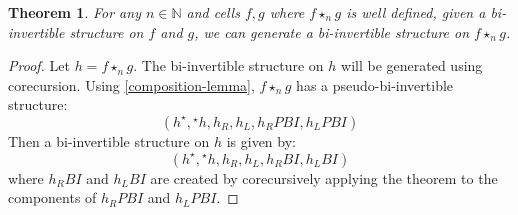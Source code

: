 \documentclass{article}
\newtheorem{theorem}{Theorem}
\theoremstyle{definition}
\theoremstyle{remark}
\newcommand{\linv}[1]{{}^\star\!#1}
\newcommand{\rinv}[1]{#1^\star}
\newcommand{\comp}{\star}
\begin{document}
\begin{theorem}\label{bi-inv-composition}
  For any \(n \in \mathbb{N}\) and cells \(f,g\) where \(f \comp_n g\) is well defined, given a bi-invertible structure on \(f\) and \(g\), we can generate a bi-invertible structure on \(f \comp_n g\).
\end{theorem}
\begin{proof}
  Let \(h = f \comp_n g\). The bi-invertible structure on \(h\) will be generated using corecursion. Using \cref{composition-lemma}, \(f \comp_n g\) has a pseudo-bi-invertible structure:
  \begin{equation*}
    (\rinv h, \linv h, h_R, h_L, h_R{}PBI, h_L{}PBI)
  \end{equation*}
  Then a bi-invertible structure on \(h\) is given by:
  \begin{equation*}
    (\rinv h, \linv h, h_R, h_L, h_R{}BI, h_L{}BI)
  \end{equation*}
  where \(h_R{}BI\) and \(h_L{}BI\) are created by corecursively applying the theorem to the components of \(h_R{}PBI\) and \(h_L{}PBI\).
\end{proof}
\end{document}
